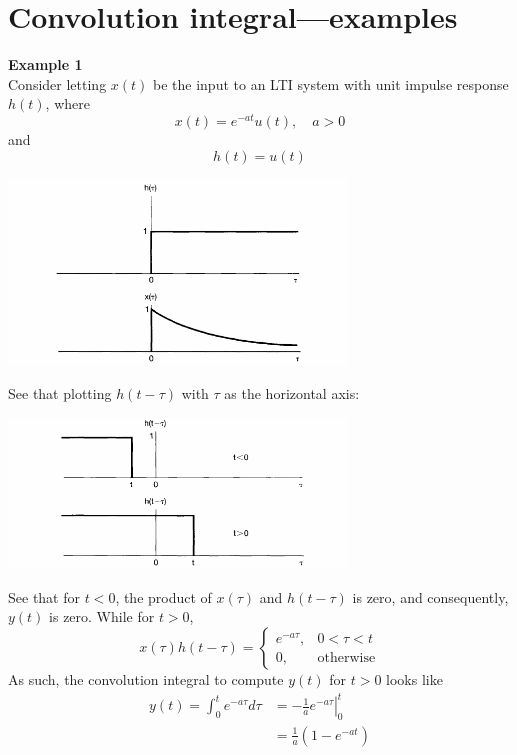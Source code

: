 \documentclass{report}
\begin{document}
\section{Convolution integral---examples}
\textbf{Example 1}\\
Consider letting $x(t)$ be the input to an LTI system with unit impulse response $h(t)$, where
\begin{equation*}
x(t)=e^{-at}u(t),\quad a>0
\end{equation*}
and 
\begin{equation*}
h(t)=u(t)
\end{equation*}
\begin{center}
\includegraphics[width=9cm]{a32}\\
\end{center}
See that plotting $h(t-\tau)$ with $\tau$ as the horizontal axis:
\begin{center}
\includegraphics[width=9cm]{a33}\\
\end{center}
See that for $t<0$, the product of $x(\tau)$ and $h(t-\tau)$ is zero, and consequently, $y(t)$ is zero. While for
$t>0$,
\begin{equation*}
x(\tau)h(t-\tau)=\begin{cases}
e^{-a\tau},&0<\tau<t\\
0,&\text{otherwise}
\end{cases}
\end{equation*}
As such, the convolution integral to compute $y(t)$ for $t>0$ looks like
\begin{align*}
y(t)=\int^t_0e^{-a\tau}d\tau&=
\left.-\frac{1}{a}e^{-a\tau}\right|^t_0\\
&=\frac{1}{a}(1-e^{-at})
\end{align*}
\end{document}
